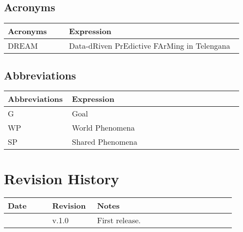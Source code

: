 \subsection{Acronyms}

\begin{center}
	\begin{tabular}{@{}p{0.25\linewidth} p{0.71\linewidth}@{}}
		\toprule
		\textbf{Acronyms} & \textbf{Expression}\\
		\midrule
		DREAM & Data-dRiven PrEdictive FArMing in Telengana\\
		\bottomrule
	\end{tabular}
\end{center}

\subsection{Abbreviations}
\begin{center}
	\begin{tabular}{@{}p{0.25\linewidth} p{0.71\linewidth}@{}}
		\toprule
		\textbf{Abbreviations} & \textbf{Expression}\\
		\midrule
		G & Goal\\
		WP & World Phenomena\\
		SP & Shared Phenomena\\
		\bottomrule
	\end{tabular}
\end{center}

\section{Revision History}

\begin{center}
	\begin{tabular}{@{}p{0.18\linewidth} p{0.18\linewidth} p{0.57\linewidth}@{}}
		\toprule
		\textbf{Date} & \textbf{Revision} & \textbf{Notes}\\
		\midrule
		\date{} & v.1.0 & First release.\\
		\bottomrule
	\end{tabular}
\end{center}

